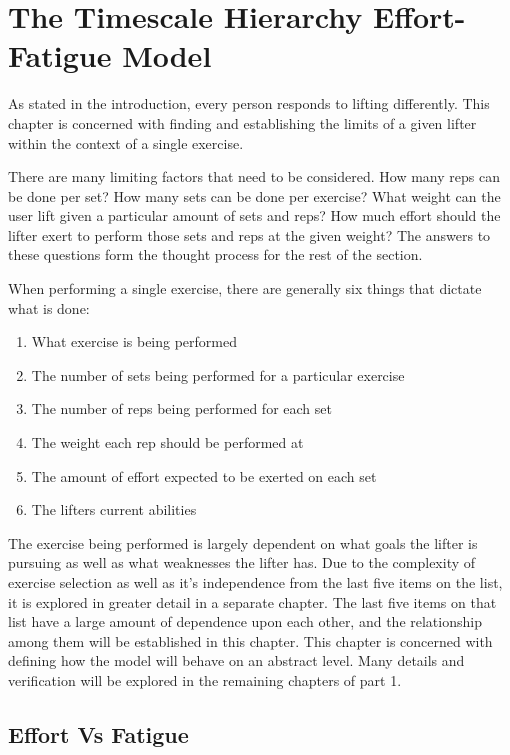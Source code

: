 \chapter{The Timescale Hierarchy Effort-Fatigue Model}
\label{ch:TheEffortFatigueModel}

As stated in the introduction, every person responds to lifting differently. This chapter is concerned with finding and establishing the limits of a given lifter within the context of a single exercise.

There are many limiting factors that need to be considered. How many reps can be done per set? How many sets can be done per exercise? What weight can the user lift given a particular amount of sets and reps? How much effort should the lifter exert to perform those sets and reps at the given weight? The answers to these questions form the thought process for the rest of the section.

When performing a single exercise, there are generally six things that dictate what is done:
\begin{enumerate}
    \item What exercise is being performed
    \item The number of sets being performed for a particular exercise
    \item The number of reps being performed for each set
    \item The weight each rep should be performed at
    \item The amount of effort expected to be exerted on each set
    \item The lifters current abilities
\end{enumerate}

The exercise being performed is largely dependent on what goals the lifter is pursuing as well as what weaknesses the lifter has. Due to the complexity of exercise selection as well as it's independence from the last five items on the list, it is explored in greater detail in a separate chapter. The last five items on that list have a large amount of dependence upon each other, and the relationship among them will be established in this chapter. This chapter is concerned with defining how the model will behave on an abstract level. Many details and verification will be explored in the remaining chapters of part 1.

\section{Effort Vs Fatigue}
\label{sec:P2C1_EffortVsFatigue}

